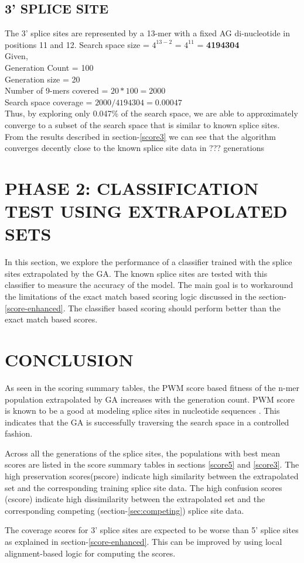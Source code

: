 \documentclass[12pt,a4paper]{article}
\begin{document}
	\subsection{3' SPLICE SITE}
	The 3' splice sites are represented by a 13-mer with a fixed AG di-nucleotide in positions 11 and 12.
	Search space size = $4^{13-2}$ = $4^11$ = \textbf{4194304} \\
	Given, \\
	Generation Count = 100 \\
	Generation size = 20 \\
	Number of 9-mers covered = $20 * 100 = 2000 $\\
	Search space coverage = $2000 / 4194304 = 0.00047$ \\
	Thus, by exploring only 0.047\% of the search space, we are able to approximately converge to a subset of the search space that is similar to known splice sites.
	From the results described in section-\ref{score3} we can see that the algorithm converges decently close to the known splice site data in ??? generations\par

	\section{PHASE 2: CLASSIFICATION TEST USING EXTRAPOLATED SETS}
	
	In this section, we explore the performance of a classifier trained with the splice sites extrapolated by the GA. The known splice sites are tested with this classifier to measure the accuracy of the model. The main goal is to workaround the limitations of the exact match based scoring logic discussed in the section-\ref{score-enhanced}. The classifier based scoring should perform better than the exact match based scores.
	
	

	\section{CONCLUSION}
	As seen in the scoring summary tables, the PWM score based fitness of the n-mer population extrapolated by GA increases with the generation count. PWM score is known to be a good at modeling splice sites in nucleotide sequences \cite{pwm-2}. This indicates that the GA is successfully traversing the search space in a controlled fashion. \par
	Across all the generations of the splice sites, the populations with best mean scores are listed in the score summary tables in sections \ref{score5} and \ref{score3}. The high preservation scores(pscore) indicate high similarity between the extrapolated set and the corresponding training splice site data. The high confusion scores (cscore) indicate high dissimilarity between the extrapolated set and the corresponding competing (section-\ref{sec:competing}) splice site data. \par
	The coverage scores for 3' splice sites are expected to be worse than 5' splice sites as explained in section-\ref{score-enhanced}. This can be improved by using local alignment-based logic for computing the scores.
	
\end{document}
